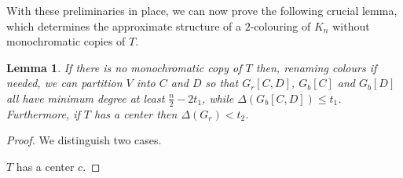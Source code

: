 \documentclass[11pt]{article}
\newtheorem{lemma}[theorem]{Lemma}
\begin{document}
With these preliminaries in place, we can now prove the following crucial lemma, which determines the approximate structure of a $2$-colouring of $K_n$ without monochromatic copies of $T$.

\begin{lemma}
\label{commonlem}
    If there is no monochromatic copy of $T$ then, renaming colours if needed, we can partition $V$ into $C$ and $D$ so that $G_r[C,D]$, $G_b[C]$ and $G_b[D]$ all have minimum degree at least $\frac{n}{2}-2t_1$, while $\Delta(G_b[C,D]) \le t_1$. Furthermore, if $T$ has a center then $\Delta(G_r)<t_2$. 
\end{lemma}
\begin{proof}
We distinguish two cases.
   
 $T$ has a center $c$.


\end{proof}
\end{document}
